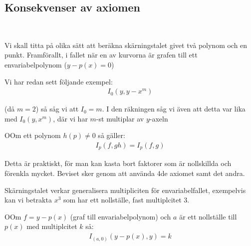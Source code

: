 \subsection{Konsekvenser av axiomen}\hfill\\\par
\noindent Vi skall titta på olika sätt att beräkna skärningstalet givet två polynom och en punkt. Framförallt, i fallet när en av kurvorna är grafen till ett envariabelpolynom ($y-p(x)=0$)
\par\bigskip
\noindent Vi har redan sett följande exempel:
\begin{equation*}
  \begin{gathered}
    I_0(y,y-x^m)
  \end{gathered}
\end{equation*}\par
\noindent (då $m=2$) så såg vi att $I_0=m$. I den räkningen såg vi även att detta var lika med $I_0(y,x^m)$, där vi har $m$-st multiplar av $y$-axeln
\par\bigskip
\begin{theo}
  OOm ett polynom $h(p)\neq0$ så gäller:
  \begin{equation*}
    \begin{gathered}
      I_p(f,gh) = I_p(f,g)
    \end{gathered}
  \end{equation*}
\end{theo}
\par\bigskip
\noindent Detta är praktiskt, för man kan kasta bort faktorer som är nollskillda och förenkla mycket. Beviset sker genom att använda 4de axiomet samt det andra.
\par\bigskip
\noindent Skärningstalet verkar generalisera multipliciten för envariabelfallet, exempelvis kan vi betrakta $x^3$ som har ett nollställe, fast multiplcitet 3.
\par\bigskip
\begin{theo}
  OOm $f=y-p(x)$ (graf till envariabelpolynom) och $a$ är ett nollställe till $p(x)$ med multiplcitet $k$ så:
  \begin{equation*}
    \begin{gathered}
      I_{(a,0)}(y-p(x),y) = k
    \end{gathered}
  \end{equation*}
\end{theo}
\par\bigskip
